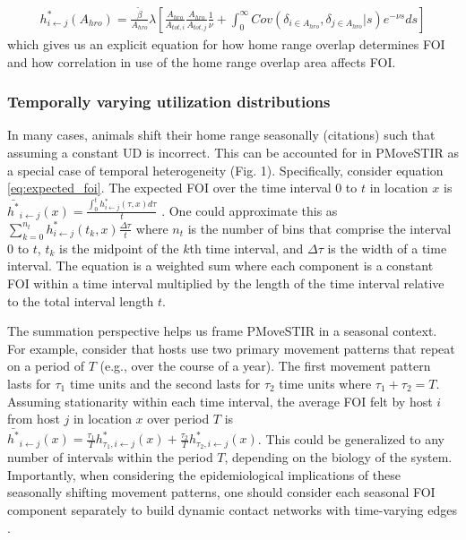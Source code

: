 \documentclass[letterpaper]{article}
\begin{document}
\begin{equation}
    \begin{aligned}
    h^*_{i \leftarrow j}(A_{hro}) = \frac{\tilde{\beta}}{A_{hro}} \lambda [\frac{A_{hro}}{A_{tot, i}} \frac{A_{hro}}{A_{tot, j}}  \frac{1}{\nu} + \int_{0}^{\infty} Cov(\delta_{i \in A_{hro}}, \delta_{j \in A_{hro}} | s) e^{-\nu s} ds]
    \end{aligned}
    \label{eq:home_range}
\end{equation}
which gives us an explicit equation for how home range overlap determines FOI and how correlation in use of the home range overlap area affects FOI. 

\subsubsection*{Temporally varying utilization distributions}

In many cases, animals shift their home range seasonally (citations) such that assuming a constant UD is incorrect. This can be accounted for in PMoveSTIR as a special case of temporal heterogeneity (Fig. 1).  Specifically, consider equation \ref{eq:expected_foi}. The expected FOI over the time interval 0 to $t$ in location $x$ is $\bar{h^*}_{i \leftarrow j}(x) = \frac{\int_0^t h^*_{i \leftarrow j}(\tau, x) d\tau}{t}$ \citep{Wilber2022}.  One could approximate this as $\sum_{k = 0}^{n_t} h^*_{i \leftarrow j}(t_k, x) \frac{\Delta \tau}{t}$ where $n_t$ is the number of bins that comprise the interval 0 to $t$, $t_k$ is the midpoint of the $k$th time interval, and $\Delta \tau$ is the width of a time interval.  The equation is a weighted sum where each component is a constant FOI within a time interval multiplied by the length of the time interval relative to the total interval length $t$.  

The summation perspective helps us frame PMoveSTIR in a seasonal context.  For example, consider that hosts use two primary movement patterns that repeat on a period of $T$ (e.g., over the course of a year).  The first movement pattern lasts for $\tau_1$ time units and the second lasts for $\tau_2$ time units where $\tau_1 + \tau_2 = T$.  Assuming stationarity within each time interval, the average FOI felt by host $i$ from host $j$ in location $x$ over period $T$ is $\bar{h^*}_{i \leftarrow j}(x) = \frac{\tau_1}{T} h^*_{\tau_1, i \leftarrow j}(x) + \frac{\tau_2}{T} h^*_{\tau_2, i \leftarrow j}(x)$.  This could be generalized to any number of intervals within the period $T$, depending on the biology of the system.  Importantly, when considering the epidemiological implications of these seasonally shifting movement patterns, one should consider each seasonal FOI component separately to build dynamic contact networks with time-varying edges \citep{Wilber2022}.
\end{document}
